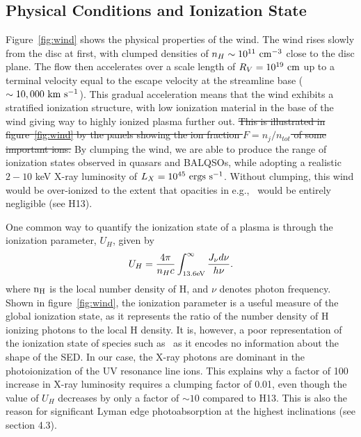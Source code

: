 \documentclass[preprint, a4paper, 11pt]{aastex}
\providecommand{\DIFdel}[1]{{\protect\color{red}\sout{#1}}}                      %
\providecommand{\DIFdelbegin}{} %
\providecommand{\DIFdelend}{} %
\begin{document}
\subsection{Physical Conditions and Ionization State}

Figure~\ref{fig:wind} shows the physical properties of the wind.
The wind rises slowly from the disc at first, with clumped densities
of $n_H \sim 10^{11}~\rm{cm^{-3}}$ close to the disc plane.
The flow then accelerates over a scale length of $R_V=10^{19}~\rm{cm}$
up to a terminal velocity equal to the escape velocity at the streamline base
($\sim10,000~\rm{km~s^{-1}}$). This gradual acceleration means that
the wind exhibits a stratified ionization structure, with low ionization material
in the base of the wind giving way to highly ionized plasma further out.
\DIFdelbegin \DIFdel{This is illustrated in figure~\ref{fig:wind} 
by the panels showing the ion fraction $F=n_j/n_{tot}$ of some important ions.
}\DIFdelend By clumping the wind, we are able to produce the range of ionization states observed
in quasars and BALQSOs, while adopting a realistic $2-10$ keV X-ray luminosity
of $L_{X}=10^{45}~\rm{ergs~s^{-1}}$. Without clumping, this wind would be over-ionized 
to the extent that opacities in e.g., \civ\ would be entirely negligible (see H13).

One common way to quantify the ionization state of a plasma
is through the ionization parameter, $U_H$, given by
\begin{equation}
U_H = \frac{4\pi}{n_H c}\int_{13.6{\rm{eV}}}^{\infty}\frac{{J_{\nu}d\nu}}{h\nu}.
\end{equation}
\noindent where $\rm{n_H}$ is the local number density of H, and $\nu$ denotes photon 
frequency. Shown in figure~\ref{fig:wind},
the ionization parameter is a useful measure of the global ionization state,
as it represents the ratio of the number density of 
H ionizing photons to the local H density.
It is, however, a poor representation of the 
ionization state of species such as \civ\ as it encodes no information
about the shape of the SED. In our case, the X-ray photons 
are dominant in the photoionization of the UV resonance line ions. 
This explains why a factor of 100 increase in X-ray luminosity requires
a clumping factor of 0.01, even though the value of $U_H$ decreases by only a factor of $\sim10$ 
compared to H13. This is also the reason for significant Lyman edge photoabsorption
at the highest inclinations (see section 4.3).
\end{document}
